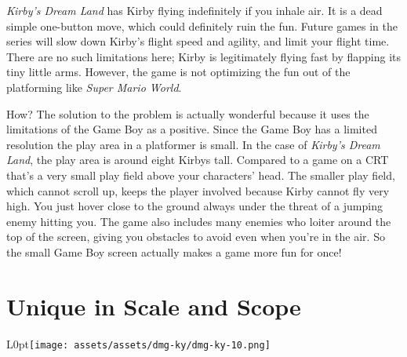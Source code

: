 \documentclass{book}
\begin{document}
\emph{Kirby’s Dream Land} has Kirby flying indefinitely if you inhale air. It is a dead simple one-button move, which could definitely ruin the fun. Future games in the series will slow down Kirby’s flight speed and agility, and limit your flight time. There are no such limitations here; Kirby is legitimately flying fast by flapping its tiny little arms. However, the game is not optimizing the fun out of the platforming like \emph{Super Mario World}.\par
\FloatBarrier\vspace{\baselineskip}\begin{figure}[H]\end{figure}
How? The solution to the problem is actually wonderful because it uses the limitations of the Game Boy as a positive. Since the Game Boy has a limited resolution the play area in a platformer is small. In the case of \emph{Kirby’s Dream Land}, the play area is around eight Kirbys tall. Compared to a game on a CRT that’s a very small play field above your characters’ head. The smaller play field, which cannot scroll up, keeps the player involved because Kirby cannot fly very high. You just hover close to the ground always under the threat of a jumping enemy hitting you. The game also includes many enemies who loiter around the top of the screen, giving you obstacles to avoid even when you’re in the air. So the small Game Boy screen actually makes a game more fun for once!\par
\FloatBarrier\section*{Unique in Scale and Scope}
\begin{wrapfigure}{L}{0pt}{\texttt{[image: assets/assets/dmg-ky/dmg-ky-10.png]}}\end{wrapfigure}\noindent
\end{document}
